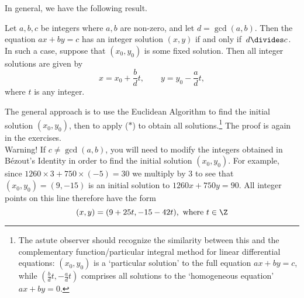 In general, we have the following result.

\begin{thm}\label{thm:diophanine}
Let $a,b,c$ be integers where $a,b$ are non-zero, and let $d=\gcd(a,b)$. Then the equation $ax+by=c$ has an integer solution $(x,y)$ if and only if $\,d\divides c$.\\
In such a case, suppose that $(x_0,y_0)$ is some fixed solution. Then all integer solutions are given by
\[x=x_0+\frac bdt,\qquad y=y_0-\frac adt,\tag*{($\ast$)}\]
where $t$ is any integer.
\end{thm}

\noindent The general approach is to use the Euclidean Algorithm to find the initial solution $(x_0,y_0)$, then to apply ($\ast$) to obtain all solutions.\footnote{The astute observer should recognize the similarity between this and the complementary function/particular integral method for linear differential equations: $(x_0,y_0)$ is a `particular solution' to the full equation $ax+by=c$, while $(\frac bdt,-\frac adt)$ comprises all solutions to the `homogeneous equation' $ax+by=0$.} The proof is again in the exercises.\\

\noindent Warning! If $c\neq\gcd(a,b)$, you will need to modify the integers obtained in Bézout's Identity in order to find the initial solution $(x_0,y_0)$. For example, since $1260\times 3+750\times(-5)=30$ we multiply by 3 to see that $(x_0,y_0)=(9,-15)$ is an initial solution to $1260x+750y=90$. All integer points on this line therefore have the form
\[(x,y)=(9+25t,-15-42t), \text{ where }t\in\Z\]

